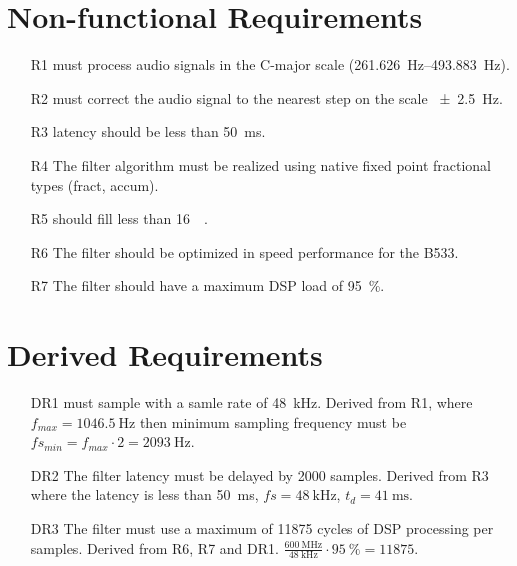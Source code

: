 \section{Non-functional Requirements}
\label{sec:nonfunc}
\begin{itemize}
	\item[R1] \systemName must process audio signals in the C-major scale (\SIrange{261.626}{493.883}{\hertz}).
	\item[R2] \systemName must correct the audio signal to the nearest step on the scale \SI{\pm 2.5}{\hertz}.
	\item[R3] \systemName latency should be less than \SI{50}{\milli\second}.
	\item[R4] The filter algorithm must be realized using native fixed point fractional types (fract, accum).
	\item[R5] \systemName should fill less than \SI{16}{\kilo\byte}.
	\item[R6] The filter should be optimized in speed performance for the B533.
	\item[R7] The filter should have a maximum DSP load of \SI{95}{\percent}.
\end{itemize}

\section{Derived Requirements}
\begin{itemize}
	\item[DR1] \systemName must sample with a samle rate of \SI{48}{\kilo\hertz}.
	Derived from R1, where $f_{max}=\SI{1046.5}{\hertz}$ then minimum sampling frequency must be $fs_{min} = f_{max}\cdot 2 = \SI{2093}{\hertz}$.
	\item[DR2] The filter latency must be delayed by \num{2000} samples.
	Derived from R3 where the latency is less than \SI{50}{\milli\second}, $fs = \SI{48}{\kilo\hertz}$, $t_d = \SI{41}{\milli\second}$.
	\item[DR3] The filter must use a maximum of \num{11875} cycles of DSP processing per samples. Derived from R6, R7 and DR1.
	$\frac{\SI{600}{\mega\hertz}}{\SI{48}{\kilo\hertz}}\cdot\SI{95}{\percent} = \num{11875}$.
\end{itemize}

